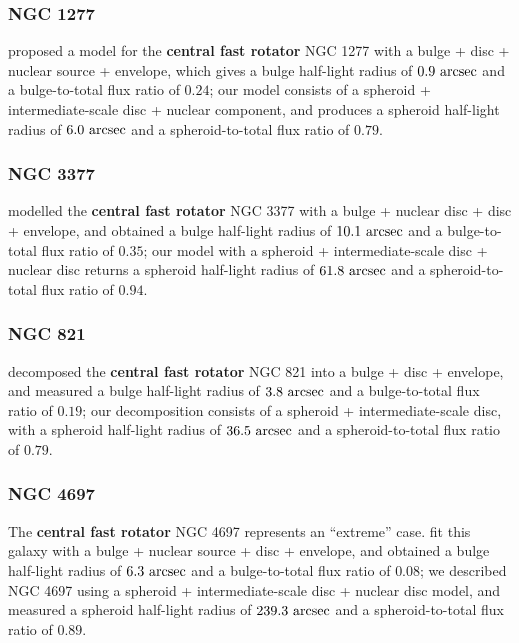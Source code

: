\documentclass[useAMS,usenatbib,article]{mnras}
\begin{document}
\subsubsection{NGC 1277}
\cite{vandenbosch2012} proposed a model for the {\bf central fast rotator} NGC 1277 with a bulge + disc + nuclear source + envelope, 
which gives a bulge half-light radius of $0.9~\rm arcsec$ and a bulge-to-total flux ratio of $0.24$; 
our model consists of a spheroid + intermediate-scale disc + nuclear component, 
and produces a spheroid half-light radius of $6.0~\rm arcsec$ and a spheroid-to-total flux ratio of $0.79$. 

\subsubsection{NGC 3377}
\cite{lasker2014data} modelled the {\bf central fast rotator} NGC 3377 with a bulge + nuclear disc + disc + envelope, 
and obtained a bulge half-light radius of $10.1~\rm arcsec$ and a bulge-to-total flux ratio of $0.35$; 
our model with a spheroid + intermediate-scale disc + nuclear disc 
returns a spheroid half-light radius of $61.8~\rm arcsec$ and a spheroid-to-total flux ratio of $0.94$. 

\subsubsection{NGC 821}
\cite{lasker2014data} decomposed the {\bf central fast rotator} NGC 821 into a bulge + disc + envelope, 
and measured a bulge half-light radius of $3.8~\rm arcsec$ and a bulge-to-total flux ratio of $0.19$; 
our decomposition consists of a spheroid + intermediate-scale disc, 
with a spheroid half-light radius of $36.5~\rm arcsec$ and a spheroid-to-total flux ratio of $0.79$. 

\subsubsection{NGC 4697}
The {\bf central fast rotator} NGC 4697 represents an ``extreme'' case. 
\cite{lasker2014data} fit this galaxy with a bulge + nuclear source + disc + envelope, 
and obtained a bulge half-light radius of $6.3~\rm arcsec$ and a bulge-to-total flux ratio of $0.08$; 
we described NGC 4697 using a spheroid + intermediate-scale disc + nuclear disc model, 
and measured a spheroid half-light radius of $239.3~\rm arcsec$ and a spheroid-to-total flux ratio of $0.89$. \\
\end{document}
